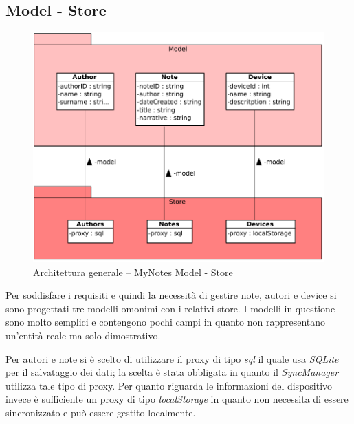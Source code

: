 \subsection{Model - Store}
\begin{figure}[htb]
\centering
\includegraphics[scale=0.6]{gfx/class/MyNotes_Model_Store.pdf}
\caption{Architettura generale -- MyNotes Model - Store}
\label{fig:architettura MyNotes Model-Store}
\end{figure}
Per soddisfare i requisiti e quindi la necessità di gestire note, autori e device si sono progettati tre modelli omonimi con i relativi store.
I modelli in questione sono molto semplici e contengono pochi campi in quanto non rappresentano un'entità reale ma solo dimostrativo.

Per autori e note si è scelto di utilizzare il proxy di tipo \emph{sql} il quale usa \emph{SQLite} per il salvataggio dei dati; la scelta è stata obbligata in quanto il \emph{SyncManager} utilizza tale tipo di proxy.
Per quanto riguarda le informazioni del dispositivo invece è sufficiente un proxy di tipo \emph{localStorage} in quanto non necessita di essere sincronizzato e può essere gestito localmente.

